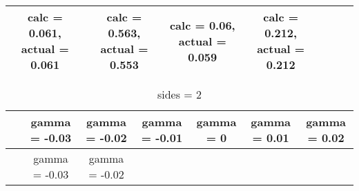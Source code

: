 \documentclass[
]{article}
\begin{document}
\begin{longtable}[]{@{}ccccccc@{}}
\begin{minipage}[t]{0.12\columnwidth}
calc = 0.061, actual = 0.061\strut
\end{minipage} & \begin{minipage}[t]{0.12\columnwidth}\centering
calc = 0.563, actual = 0.553\strut
\end{minipage} & \begin{minipage}[t]{0.12\columnwidth}\centering
calc = 0.06, actual = 0.059\strut
\end{minipage} & \begin{minipage}[t]{0.12\columnwidth}\centering
calc = 0.212, actual = 0.212\strut
\end{minipage}\tabularnewline
\bottomrule
\end{longtable}

\begin{longtable}[]{@{}ccccccc@{}}
\caption{sides = 2}\tabularnewline
\toprule
\begin{minipage}[b]{0.09\columnwidth}\centering
~\strut
\end{minipage} & \begin{minipage}[b]{0.08\columnwidth}\centering
gamma = -0.03\strut
\end{minipage} & \begin{minipage}[b]{0.08\columnwidth}\centering
gamma = -0.02\strut
\end{minipage} & \begin{minipage}[b]{0.08\columnwidth}\centering
gamma = -0.01\strut
\end{minipage} & \begin{minipage}[b]{0.16\columnwidth}\centering
gamma = 0\strut
\end{minipage} & \begin{minipage}[b]{0.16\columnwidth}\centering
gamma = 0.01\strut
\end{minipage} & \begin{minipage}[b]{0.16\columnwidth}\centering
gamma = 0.02\strut
\end{minipage}\tabularnewline
\midrule
\endfirsthead
\toprule
\begin{minipage}[b]{0.09\columnwidth}\centering
~\strut
\end{minipage} & \begin{minipage}[b]{0.08\columnwidth}\centering
gamma = -0.03\strut
\end{minipage} & \begin{minipage}[b]{0.08\columnwidth}\centering
gamma = -0.02\strut
\end{minipage} & \begin{minipage}[b]{0.08\columnwidth}\centering

\end{minipage}
\end{longtable}
\end{document}
